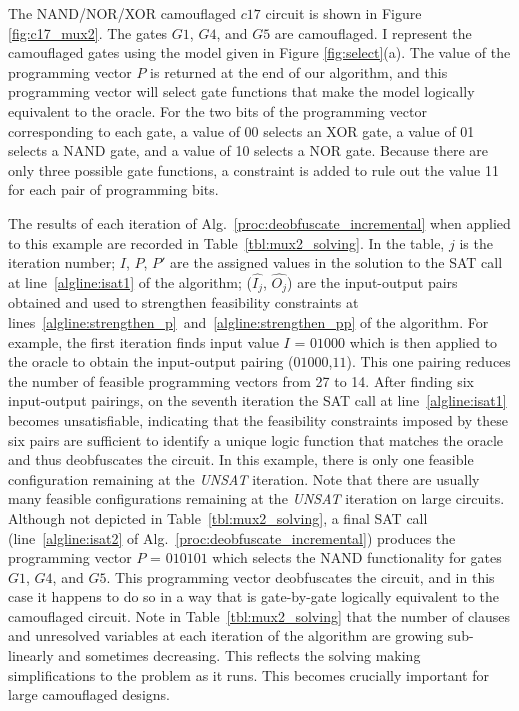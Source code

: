 \documentclass[proposal]{umassthesis}  %
\begin{document}
The NAND/NOR/XOR camouflaged $c17$ circuit is shown in Figure \ref{fig:c17_mux2}. The gates $G{1}$, $G{4}$, and $G{5}$ are camouflaged. I represent the camouflaged gates using the model given in Figure \ref{fig:select}(a). The value of the programming vector $P$ is returned at the end of our algorithm, and this programming vector will select gate functions that make the model logically equivalent to the oracle. For the two bits of the programming vector corresponding to each gate, a value of 00 selects an XOR gate, a value of 01 selects a NAND gate, and a value of 10 selects a NOR gate. Because there are only three possible gate functions, a constraint is added to rule out the value 11 for each pair of programming bits.

The results of each iteration of Alg.~\ref{proc:deobfuscate_incremental} when applied to this example are recorded in Table~\ref{tbl:mux2_solving}. In the table, $j$ is the iteration number; $I$, $P$, $P'$ are the assigned values in the solution to the SAT call at line~\ref{algline:isat1} of the algorithm; ($\hat{I_{j}}$, $\hat{O_{j}}$) are the input-output pairs obtained and used to strengthen feasibility constraints at lines~\ref{algline:strengthen_p}~and~\ref{algline:strengthen_pp} of the algorithm. For example, the first iteration finds input value $I$ = $01000$ which is then applied to the oracle to obtain the input-output pairing ($01000$,$11$). This one pairing reduces the number of feasible programming vectors from 27 to 14. After finding six input-output pairings, on the seventh iteration the SAT call at line~\ref{algline:isat1} becomes unsatisfiable, indicating that the feasibility constraints imposed by these six pairs are sufficient to identify a unique logic function that matches the oracle and thus deobfuscates the circuit. In this example, there is only one feasible configuration remaining at the \textit{UNSAT} iteration. Note that there are usually many feasible configurations remaining at the \textit{UNSAT} iteration on large circuits. Although not depicted in Table~\ref{tbl:mux2_solving}, a final SAT call (line~\ref{algline:isat2} of Alg.~\ref{proc:deobfuscate_incremental}) produces the programming vector $P$ = $010101$ which selects the NAND functionality for gates $G1$, $G4$, and $G5$. This programming vector deobfuscates the circuit, and in this case it happens to do so in a way that is gate-by-gate logically equivalent to the camouflaged circuit. Note in Table~\ref{tbl:mux2_solving} that the number of clauses and unresolved variables at each iteration of the algorithm are growing sub-linearly and sometimes decreasing. This reflects the solving making simplifications to the problem as it runs. This becomes crucially important for large camouflaged designs.
\end{document}
